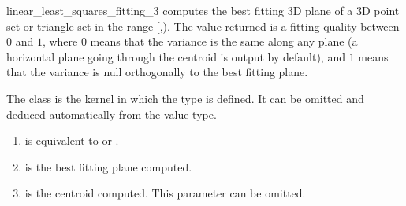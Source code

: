 \begin{ccRefFunction}{linear_least_squares_fitting_3}
{ computes the best fitting 3D plane of a 3D point set or triangle set in the range
[,). The value returned is a fitting quality
between $0$ and $1$, where $0$ means that the variance is the same
along any plane (a horizontal plane going through the centroid is output
by default), and $1$ means that the variance is null orthogonally
to the best fitting plane. }

The class  is the kernel in which the type
 is defined. It can be omitted and
deduced automatically from the value type.


\begin{enumerate}
   \item  {} is equivalent to  or .
   \item  {} is the best fitting plane computed.
   \item  {} is the centroid computed. This parameter can be
          omitted.
\end{enumerate}

\end{ccRefFunction}
